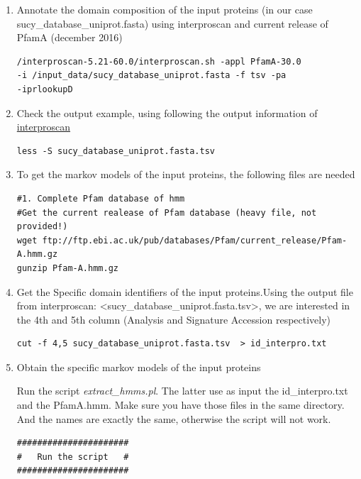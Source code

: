 \documentclass[12pt]{report}
\begin{document}
\begin{enumerate}
\item Annotate the domain composition of the input proteins (in our case
sucy\_database\_uniprot.fasta) using interproscan and current release of PfamA
(december 2016) 

\begin{verbatim}
/interproscan-5.21-60.0/interproscan.sh -appl PfamA-30.0 
-i /input_data/sucy_database_uniprot.fasta -f tsv -pa 
-iprlookupD
\end{verbatim}

\item  Check the output example, using  following the output information of
\href{https://github.com/ebi-pf-team/interproscan/wiki/InterProScan5OutputFormats}{interproscan}

\begin{verbatim}
less -S sucy_database_uniprot.fasta.tsv
\end{verbatim}

\item To get the markov models of the input  proteins, the following files are
needed

\begin{verbatim}
#1. Complete Pfam database of hmm 
#Get the current realease of Pfam database (heavy file, not provided!)
wget ftp://ftp.ebi.ac.uk/pub/databases/Pfam/current_release/Pfam-A.hmm.gz
gunzip Pfam-A.hmm.gz

\end{verbatim}

\item Get the Specific domain identifiers of the input proteins.Using the output file from interproscan: 
<sucy\_database\_uniprot.fasta.tsv>,  we are interested in the 4th and 5th
column (Analysis and Signature Accession respectively) 

\begin{verbatim}
cut -f 4,5 sucy_database_uniprot.fasta.tsv  > id_interpro.txt 
\end{verbatim}

\item Obtain the specific markov models of the input proteins 

Run the script \textit{extract\_hmms.pl}. 
The latter use as input the  id\_interpro.txt  and the  PfamA.hmm. Make sure
you have those files in the same directory. And the names are exactly the same,
otherwise the script will not work.

\begin{verbatim}
######################
#   Run the script   #
######################


\end{verbatim}
\end{enumerate}
\end{document}
